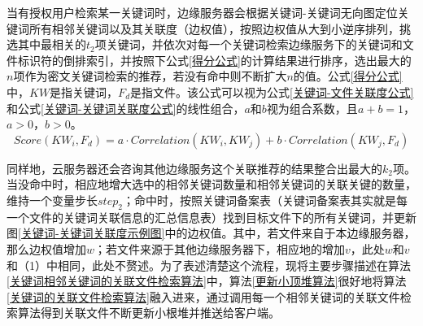 \documentclass[promaster]{thesis-uestc}
\begin{document}
当有授权用户检索某一关键词时，边缘服务器会根据关键词-关键词无向图定位关键词所有相邻关键词以及其关联度（边权值），按照边权值从大到小逆序排列，挑选其中最相关的$t_2$项关键词，并依次对每一个关键词检索边缘服务下的关键词和文件标识符的倒排索引，并按照下公式\ref{得分公式}的计算结果进行排序，选出最大的$n$项作为密文关键词检索的推荐，若没有命中则不断扩大$n$的值。公式\ref{得分公式}中，$KW$是指关键词，$F_d$是指文件。该公式可以视为公式\ref{关键词-文件关联度公式}和公式\ref{关键词-关键词关联度公式}的线性组合，$a$和$b$视为组合系数，且$a + b = 1$，$a>0$，$b>0$。
\begin{equation}
    Score(KW_i, F_d) = a \cdot Correlation(KW_i, KW_j) + b \cdot Correlation(KW_j, F_d)
    \label{得分公式}
\end{equation}

同样地，云服务器还会咨询其他边缘服务这个关联推荐的结果整合出最大的$k_2$项。当没命中时，相应地增大选中的相邻关键词数量和相邻关键词的关联关键的数量，维持一个变量步长$step_2$；命中时，按照关键词备案表（关键词备案表其实就是每一个文件的关键词关联信息的汇总信息表）找到目标文件下的所有关键词，并更新图\ref{关键词-关键词关联度示例图}中的边权值。其中，若文件来自于本边缘服务器，那么边权值增加$w$；若文件来源于其他边缘服务器下，相应地的增加$v$，此处$w$和$v$和（1）中相同，此处不赘述。为了表述清楚这个流程，现将主要步骤描述在算法\ref{关键词相邻关键词的关联文件检索算法}中，算法\ref{更新小顶堆算法}很好地将算法\ref{关键词的关联文件检索算法}融入进来，通过调用每一个相邻关键词的关联文件检索算法得到关联文件不断更新小根堆并推送给客户端。
\end{document}
